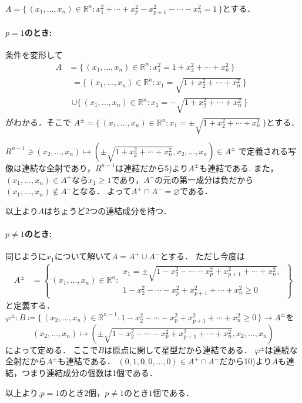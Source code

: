 \begin{tanswer}
    $A = \{\,(x_1,\ldots,x_n) \in \mathbb{R}^n: x_1^2+\cdots+x_p^2-x_{p+1}^2-\cdots-x_n^2 = 1\,\}$とする．

    \paragraph{$p=1$のとき:}
    条件を変形して
    \begin{align*}
        A
         & = \{\,(x_1,\ldots,x_n) \in \mathbb{R}^n: x_1^2 = 1+x_2^2+\cdots+x_n^2\,\} \\
         &
        \begin{multlined}
            = \{\,(x_1,\ldots,x_n) \in  \mathbb{R}^n: x_1 = \textstyle\sqrt{1+x_2^2+\cdots+x_n^2}\,\} \\
            \cup \{\,(x_1,\ldots,x_n) \in  \mathbb{R}^n: x_1 = -\textstyle\sqrt{1+x_2^2+\cdots+x_n^2}\,\}
        \end{multlined}
    \end{align*}
    がわかる．そこで
    $A^{\pm} = \{\,(x_1,\ldots,x_n) \in  \mathbb{R}^n: x_1 = \pm\textstyle\sqrt{1+x_2^2+\cdots+x_n^2}\,\}$とする．

    $R^{n-1} \ni (x_2,\ldots,x_n) \longmapsto (\pm\textstyle\sqrt{1+x_2^2+\cdots+x_n^2},x_2,\ldots,x_n) \in A^{\pm}$
    で定義される写像は連続な全射であり，$R^{n-1}$は連結だから5)より$A^{\pm}$も連結である.
    また，$(x_1,\ldots,x_n) \in A^+$なら$x_1 \ge 1$であり，$A^-$の元の第一成分は負だから$(x_1,\ldots,x_n) \notin A^-$となる．
    よって$A^+ \cap A^- = \varnothing$である．

    以上より$A$はちょうど2つの連結成分を持つ．

    \paragraph{$p\neq1$のとき:}
    同じように$x_1$について解いて$A = A^+ \cup A^-$とする．
    ただし今度は
    \begin{align*}
        A^{\pm}
         & = \left\{\,(x_1,\ldots,x_n) \in \mathbb{R}^n:
        \begin{aligned}
            x_1 = \pm\textstyle\sqrt{1-x_2^2-\cdots-x_p^2+x_{p+1}^2+\cdots+x_n^2}, \\
            1-x_2^2-\cdots-x_p^2+x_{p+1}^2+\cdots+x_n^2 \ge 0
        \end{aligned}
        \,\right\}
    \end{align*}
    と定義する．
    $\varphi^{\pm} \colon B \coloneq \{\,(x_2,\ldots,x_n) \in \mathbb{R}^{n-1}: 1-x_2^2-\cdots-x_p^2+x_{p+1}^2+\cdots+x_n^2 \ge 0\,\} \to A^{\pm}$を
    \[
        (x_2,\ldots,x_n) \longmapsto (\pm\textstyle\sqrt{1-x_2^2-\cdots-x_p^2+x_{p+1}^2+\cdots+x_n^2},x_2,\ldots,x_n)
    \]
    によって定める．
    ここで$B$は原点に関して星型だから連結である．
    $\varphi^{\pm}$は連続な全射だから$A^{\pm}$も連結である．
    $(0,1,0,0,\ldots,0) \in A^+ \cap A^-$だから10)より$A$も連結，つまり連結成分の個数は1個である．

    以上より,$p=1$のとき$2$個，$p \ne 1$のとき$1$個である．
\end{tanswer}


